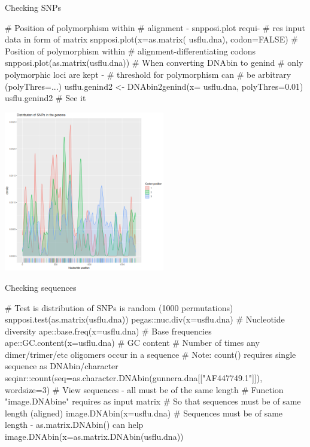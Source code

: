 \documentclass[compress, xelatex, 11pt, xcolor=svgnames, aspectratio=169,
	hyperref={
		bookmarks=true,
		unicode=true,
		colorlinks=true,
		pdftitle={Molecular data in R},
		plainpages=false,
		pdfauthor={Vojtech Zeisek},
		pdfsubject={Course about phylogeny and evolution in R},
		pdfcreator={XeLaTeX},
		pdfkeywords={R, evolution, phylogeny, molecular data},
		linkcolor=Crimson, %
		anchorcolor=Magenta, %
		citecolor=Magenta, %
		filecolor=Magenta, %
		menucolor=Magenta, %
		urlcolor=DodgerBlue, %
		},
	url={hyphens, lowtilde} %
	]{beamer}
\begin{document}
\begin{frame}[fragile]{Checking SNPs}
	\begin{multicols}{2}
		\begin{spluscode}
    # Position of polymorphism within
    # alignment - snpposi.plot requi-
    # res input data in form of matrix
    snpposi.plot(x=as.matrix(
      usflu.dna), codon=FALSE)
    # Position of polymorphism within
    # alignment-differentiating codons
    snpposi.plot(as.matrix(usflu.dna))
    # When converting DNAbin to genind
    # only polymorphic loci are kept -
    # threshold for polymorphism can
    # be arbitrary (polyThres=...)
    usflu.genind2 <- DNAbin2genind(x=
      usflu.dna, polyThres=0.01)
    usflu.genind2 # See it
		\end{spluscode}
		\begin{flushright}
			\includegraphics[height=7cm]{snpposi.png}
		\end{flushright}
	\end{multicols}
\end{frame}

\begin{frame}[fragile]{Checking sequences}
	\begin{spluscode}
    # Test is distribution of SNPs is random (1000 permutations)
    snpposi.test(as.matrix(usflu.dna))
    pegas::nuc.div(x=usflu.dna) # Nucleotide diversity
    ape::base.freq(x=usflu.dna) # Base frequencies
    ape::GC.content(x=usflu.dna) # GC content
    # Number of times any dimer/trimer/etc oligomers occur in a sequence
    # Note: count() requires single sequence as DNAbin/character
    seqinr::count(seq=as.character.DNAbin(gunnera.dna[["AF447749.1"]]),
      wordsize=3)
    # View sequences - all must be of the same length
    # Function "image.DNAbine" requires as input matrix
    # So that sequences must be of same length (aligned)
    image.DNAbin(x=usflu.dna)
    # Sequences must be of same length - as.matrix.DNAbin() can help
    image.DNAbin(x=as.matrix.DNAbin(usflu.dna))
	\end{spluscode}
\end{frame}
\end{document}
